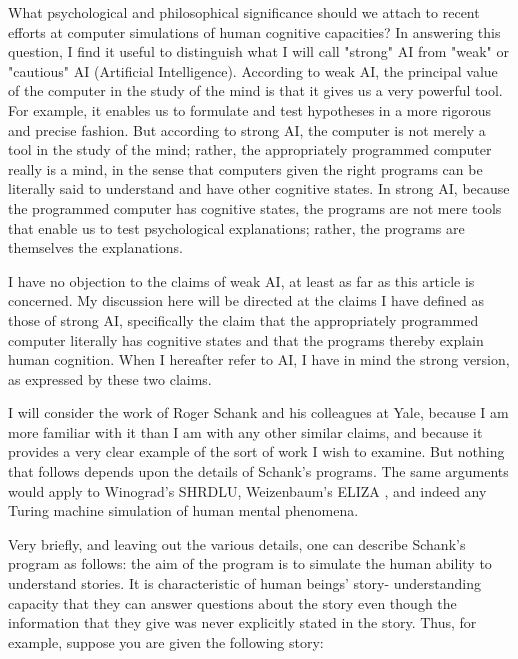 What psychological and philosophical significance should we attach to recent efforts at computer simulations of
human cognitive capacities? In answering this question, I find it useful to distinguish what I will call "strong" AI
from "weak" or "cautious" AI (Artificial Intelligence). According to weak AI, the principal value of the computer
in the study of the mind is that it gives us a very powerful tool. For example, it enables us to formulate and test
hypotheses in a more rigorous and precise fashion. But according to strong AI, the computer is not merely a
tool in the study of the mind; rather, the appropriately programmed computer really is a mind, in the sense that
computers given the right programs can be literally said to understand and have other cognitive states. In strong
AI, because the programmed computer has cognitive states, the programs are not mere tools that enable us to
test psychological explanations; rather, the programs are themselves the explanations.

I have no objection to the claims of weak AI, at least as far as this article is concerned. My discussion here will
be directed at the claims I have defined as those of strong AI, specifically the claim that the appropriately
programmed computer literally has cognitive states and that the programs thereby explain human cognition.
When I hereafter refer to AI, I have in mind the strong version, as expressed by these two claims.

I will consider the work of Roger Schank and his colleagues at Yale\autocite{Schank1}, because I am
more familiar with it than I am with any other similar claims, and because it provides a very clear example of the
sort of work I wish to examine. But nothing that follows depends upon the details of Schank's programs. The
same arguments would apply to Winograd's SHRDLU\autocite{Winograd1}, Weizenbaum's ELIZA \autocite{Weizen1}, and indeed any Turing machine simulation of human mental phenomena.

Very briefly, and leaving out the various details, one can describe Schank's program as follows: the aim of the
program is to simulate the human ability to understand stories. It is characteristic of human beings' story-
understanding capacity that they can answer questions about the story even though the information that they
give was never explicitly stated in the story. Thus, for example, suppose you are given the following story:

